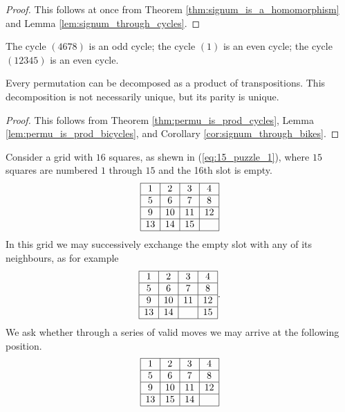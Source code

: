 \begin{proof}
This follows at once from Theorem
\ref{thm:signum_is_a_homomorphism} and Lemma
\ref{lem:signum_through_cycles}.
\end{proof}
\begin{exa}
The cycle $(4678)$ is an odd cycle; the cycle $(1)$ is an even
cycle; the cycle $(12345)$ is an even cycle.
\end{exa}
\begin{cor}\label{cor:permu_is_prod_of_bikes}
Every permutation can be decomposed as a product of
transpositions. This decomposition is not necessarily unique, but
its parity is unique.
\end{cor}
\begin{proof}
This follows from Theorem \ref{thm:permu_is_prod_cycles}, Lemma
\ref{lem:permu_is_prod_bicycles}, and Corollary
\ref{cor:signum_through_bikes}.
\end{proof}
\begin{exa} Consider a grid with $16$ squares, as shewn in (\ref{eq:15_puzzle_1}), where $15$ squares are numbered $1$ through $15$ and the 16th slot is
empty.
\begin{equation}\label{eq:15_puzzle_1}
\begin{array}{|c|c|c|c|}
\hline 1 & 2 & 3 & 4 \\ \hline 5 & 6 & 7 & 8 \\ \hline 9 & 10 & 11
& 12 \\ \hline 13 & 14 & 15 & \\ \hline
\end{array}\end{equation}
In this grid we may successively exchange the empty slot with any
of its neighbours, as for example
\begin{equation}\label{eq:15_puzzle_2}
\begin{array}{|c|c|c|c|}
\hline 1 & 2 & 3 & 4 \\ \hline 5 & 6 & 7 & 8 \\ \hline 9 & 10 & 11
& 12 \\ \hline 13 & 14 &  & 15 \\ \hline
\end{array}.
\end{equation}We ask whether through a series of valid moves we may arrive at the following position.
\begin{equation}\label{eq:15_puzzle_3}
\begin{array}{|c|c|c|c|}
\hline 1 & 2 & 3 & 4 \\ \hline 5 & 6 & 7 & 8 \\ \hline 9 & 10 & 11
& 12 \\ \hline 13 & 15 & 14 &  \\ \hline
\end{array}
\end{equation}
\end{exa}
